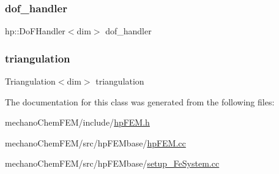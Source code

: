 \mbox{\label{classhp_f_e_m_ab4df20fb431f370878adc06e19280d62}} 
\subsubsection{\texorpdfstring{dof\_handler}{dof\_handler}}
{\footnotesize\ttfamily hp\+::\+Do\+F\+Handler$<$dim$>$ dof\+\_\+handler}

\mbox{\label{classhp_f_e_m_a1e604d1e68926caf1ebc67d2a7451783}} 
\subsubsection{\texorpdfstring{triangulation}{triangulation}}
{\footnotesize\ttfamily Triangulation$<$dim$>$ triangulation}



The documentation for this class was generated from the following files\+:\begin{DoxyCompactItemize}
\item 
mechano\+Chem\+F\+E\+M/include/\mbox{\hyperlink{hp_f_e_m_8h}{hp\+F\+E\+M.\+h}}\item 
mechano\+Chem\+F\+E\+M/src/hp\+F\+E\+Mbase/\mbox{\hyperlink{hp_f_e_m_8cc}{hp\+F\+E\+M.\+cc}}\item 
mechano\+Chem\+F\+E\+M/src/hp\+F\+E\+Mbase/\mbox{\hyperlink{setup___fe_system_8cc}{setup\+\_\+\+Fe\+System.\+cc}}\end{DoxyCompactItemize}
